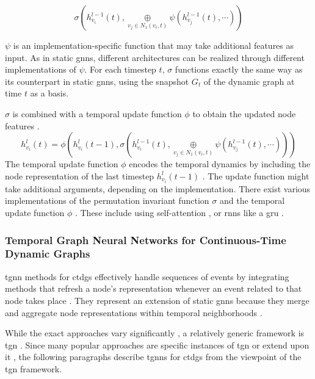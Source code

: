 \begin{equation}
    \sigma(h_{v_i}^{l-1}(t), \underset{v_j \in N_1(v_i, t)}{\oplus} \psi(h_{v_j}^{l-1}(t), \cdots))
\end{equation}

$\psi$ is an implementation-specific function that may take additional features as input. As in static \glspl{gnn}, different architectures can be realized through different implementations of $\psi$. For each timestep $t$, $\sigma$ functions exactly the same way as its counterpart in static \glspl{gnn}, using the snapshot $G_t$ of the dynamic graph at time $t$ as a basis.

$\sigma$ is combined with a temporal update function $\phi$ to obtain the updated node features \cite{you_roland_2022}.
\begin{equation}
    h_{v_i}^l(t) = \phi(h_{v_i}^{l}(t-1), \sigma(h_{v_i}^{l-1}(t), \underset{v_j \in N_1(v_i, t)}{\oplus} \psi(h_{v_j}^{l-1}(t), \cdots)))
\end{equation}
The temporal update function $\phi$ encodes the temporal dynamics by including the node representation of the last timestep $h_{v_i}^{l}(t-1)$ \cite{longa_graph_2023}. The update function might take additional arguments, depending on the implementation. There exist various implementations of the permutation invariant function $\sigma$ and the temporal update function $\phi$ \cite{longa_graph_2023}. These include using self-attention \cite{sankar_dysat_2020}, or \glspl{rnn} like a \gls{gru} \cite{you_roland_2022}.

\newpage

\subsubsection{Temporal Graph Neural Networks for Continuous-Time\\ Dynamic Graphs}
\label{s_tgnns_for_ctdgs}
\gls{tgnn} methods for \glspl{ctdg} effectively handle sequences of events by integrating methods that refresh a node's representation whenever an event related to that node takes place \cite{longa_graph_2023}. They represent an extension of static \glspl{gnn} because they merge and aggregate node representations within temporal neighborhoods \cite{longa_graph_2023}.

While the exact approaches vary significantly \cite{longa_graph_2023}, a relatively generic framework is \gls{tgn} \cite{rossi_temporal_2020}. Since many popular approaches are specific instances of \gls{tgn} \cite{trivedi_dyrep_2019, rossi_temporal_2020} or extend upon it \cite{souza_provably_2022}, the following paragraphs describe \glspl{tgnn} for \glspl{ctdg} from the viewpoint of the \gls{tgn} framework.

